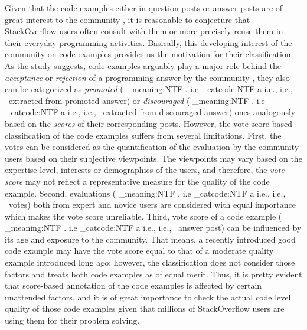 \documentclass{sig-alternate}
\makeatletter
\newcommand\latinabbrev[1]{
  \peek_meaning:NTF . {%
    #1\@}%
  { \peek_catcode:NTF a {%
      #1., \@ }%
    {#1., \@}}}
\def\ie{\latinabbrev{i.e}}
\makeatother
\begin{document}
Given that the code examples either in question posts or answer posts are of great interest to the community \cite{nasehi, nier}, it is reasonable to conjecture that  StackOverflow users often consult with them or more precisely reuse them in their everyday programming activities. Basically, this developing interest of the community on code examples provides us the motivation for their classification. As the study suggests, code examples arguably play a major role behind the \emph{acceptance} or \emph{rejection} of a programming answer by the community \cite{nasehi}, they also can be categorized as \emph{promoted} (\ie\ extracted from promoted answer) or \emph{discouraged} (\ie\ extracted from discouraged answer) ones analogously based on the \emph{scores} of their corresponding posts. However, the vote score-based classification of the code examples suffers from several limitations. First, the votes can be considered as the quantification of the evaluation by the community users based on their subjective viewpoints. The viewpoints may vary based on the expertise level, interests or demographics of the users, and therefore, the \emph{vote score} may not reflect a representative measure for the quality of the code example. Second, evaluations (\ie\ votes) both from expert and novice users are considered with equal importance which makes the vote score unreliable. Third, vote score of a code example (\ie\ answer post) can be influenced by its age and exposure to the community. That means, a recently introduced good code example may have the vote score equal to that of a moderate quality example introduced long ago; however, the classification does not consider those factors and treats both code examples  as of equal merit. Thus, it is pretty evident that score-based annotation of the code examples is affected by certain unattended factors, and it is of great importance to check the actual code level quality of those code examples given that millions of StackOverflow users are using them for their problem solving. 
\end{document}
